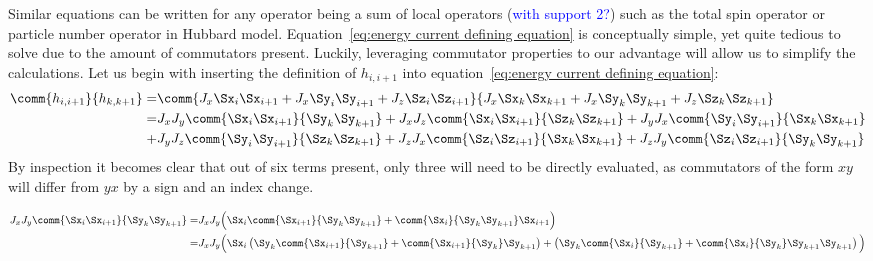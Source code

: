 Similar equations can be written for any operator being a sum of local operators (\textcolor{blue}{with support 2?}) such as
the total spin operator or particle number operator in Hubbard model. Equation~\eqref{eq:energy current defining equation} is
conceptually simple, yet quite tedious to solve due to the amount of commutators present. Luckily, leveraging commutator properties
to our advantage will allow us to simplify the calculations. Let us begin with inserting the definition of \(h_{i,i+1}\) into 
equation~\eqref{eq:energy current defining equation}:
\begin{align*}
    \comm{h_{i,i+1}}{h_{k,k+1}} =& \comm{J_{x} \Sx_{i}\Sx_{i+1} + J_{x} \Sy_{i}\Sy_{i+1} + J_{z} \Sz_{i}\Sz_{i+1}}{J_{x} \Sx_{k}\Sx_{k+1} + J_{x} \Sy_{k}\Sy_{k+1} + J_{z} \Sz_{k}\Sz_{k+1}}\\
    =& J_{x} J_{y}\comm{\Sx_{i}\Sx_{i+1}}{\Sy_{k}\Sy_{k+1}} + J_{x} J_{z}\comm{\Sx_{i}\Sx_{i+1}}{\Sz_{k}\Sz_{k+1}} + J_{y} J_{x}\comm{\Sy_{i}\Sy_{i+1}}{\Sx_{k}\Sx_{k+1}}\\
    +& J_{y} J_{z}\comm{\Sy_{i}\Sy_{i+1}}{\Sz_{k}\Sz_{k+1}} + J_{z} J_{x}\comm{\Sz_{i}\Sz_{i+1}}{\Sx_{k}\Sx_{k+1}} + J_{z} J_{y}\comm{\Sz_{i}\Sz_{i+1}}{\Sy_{k}\Sy_{k+1}}  
\end{align*}
By inspection it becomes clear that out of six terms present, only three will need to be directly evaluated, as commutators of the form
\(xy\) will differ from \(yx\) by a sign and an index change.

\begin{align*}
    J_{x} J_{y}\comm{\Sx_{i}\Sx_{i+1}}{\Sy_{k}\Sy_{k+1}} =& J_x J_y \Big(\Sx_i\comm{\Sx_{i+1}}{\Sy_{k}\Sy_{k+1}} + \comm{\Sx_{i}}{\Sy_{k}\Sy_{k+1}} \Sx_{i+1} \Big)\\
    =& J_x J_y \Big( \Sx_i \left( \Sy_k \comm{\Sx_{i+1}}{\Sy_{k+1}} + \comm{\Sx_{i+1}}{\Sy_{k}} \Sy_{k+1}\right) + 
    \left( \Sy_k \comm{\Sx_{i}}{\Sy_{k+1}} + \comm{\Sx_{i}}{\Sy_{k}} \Sy_{k+1} \Sy_{k+1}\right) \Big)
\end{align*}